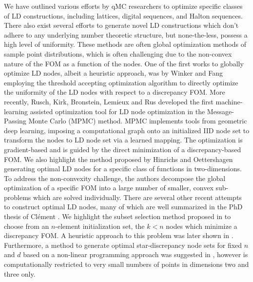\documentclass{svproc}
\newcounter{algorithm}%
\begin{document}
We have outlined various efforts by qMC researchers to optimize specific classes of LD constructions, including lattices, digital sequences, and Halton sequences. There also exist several efforts to generate novel LD constructions which don't adhere to any underlying number theoretic structure, but none-the-less, possess a high level of uniformity. These methods are often global optimization methods of sample point distributions, which is often challenging due to the non-convex nature of the FOM as a function of the nodes. 
One of the first works to globally optimize LD nodes, albeit a heuristic approach, was by Winker and Fang \cite{WinFan97b} employing the threshold accepting optimization algorithm to directly optimize the uniformity of the LD nodes with respect to a discrepancy FOM. More recently, Rusch, Kirk, Bronstein, Lemieux and Rus \cite{ruschkirk24} developed the first machine-learning assisted optimization tool for LD node optimization in the Message-Passing Monte Carlo (MPMC) method. MPMC implements tools from geometric deep learning, imposing a computational graph onto an initialized IID node set to transform the nodes to LD node set via a learned mapping. The optimization is gradient-based and is guided by the direct minimization of a discrepancy-based FOM. We also highlight the method proposed by Hinrichs and Oettershagen \cite{hinoet16} generating optimal LD nodes for a specific class of functions in two-dimensions. To address the non-convexity challenge, the authors decompose the global optimization of a specific FOM into a large number of smaller, convex sub-problems which are solved individually. There are several other recent attempts to construct optimal LD nodes, many of which are well summarized in the PhD thesis of Cl\'{e}ment \cite{clethesis24}. We highlight the subset selection method proposed in \cite{cle22} to choose from an $n$-element initialization set, the $k<n$ nodes which minimize a discrepancy FOM. A heuristic approach to this problem was later shown in \cite{cle24}. Furthermore, a method to generate optimal star-discrepancy node sets for fixed $n$ and $d$ based on a non-linear programming approach was suggested in \cite{cle24}, however is computationally restricted to very small numbers of points in dimensions two and three only.
\end{document}
